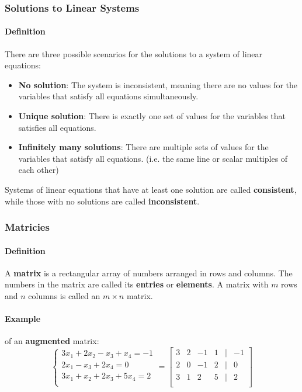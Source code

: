 \subsubsection*{Solutions to Linear Systems}
\paragraph*{Definition} There are three possible scenarios for the solutions to a system of linear equations:
\begin{itemize}
    \item \textbf{No solution}: The system is inconsistent, meaning there are no values for the variables that satisfy all equations simultaneously.
    \item \textbf{Unique solution}: There is exactly one set of values for the variables that satisfies all equations.
    \item \textbf{Infinitely many solutions}: There are multiple sets of values for the variables that satisfy all equations. (i.e. the same line or scalar multiples of each other)
\end{itemize}

Systems of linear equations that have at least one solution are called \textbf{consistent}, while those with no solutions are called \textbf{inconsistent}.

\hrulefill

\subsubsection*{Matricies}

\paragraph*{Definition} A \textbf{matrix} is a rectangular array of numbers arranged in rows and columns. The numbers in the matrix are called its \textbf{entries} or \textbf{elements}. 
A matrix with $m$ rows and $n$ columns is called an $m \times n$ matrix.

\paragraph*{Example} of an \textbf{augmented} matrix:
\[\begin{cases}
3x_1 + 2x_2 - x_3 + x_4 = -1 \\
2x_1 - x_3 + 2x_4 = 0 \\
3x_1 + x_2 + 2x_3 + 5x_4 = 2\\
\end{cases} = \begin{bmatrix}
3 & 2 & -1 & 1 & | & -1 \\
2 & 0 & -1 & 2 & | & 0 \\
3 & 1 & 2 & 5 & | & 2 \\
\end{bmatrix}\]

